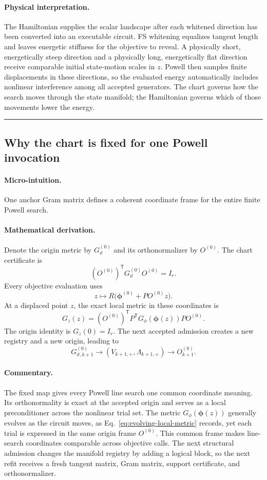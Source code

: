 \documentclass[10pt,twocolumn]{article}
\newcommand{\conceptbreak}{%
  \par\medskip\noindent
  {\color{black!30}\rule{\columnwidth}{0.35pt}}%
  \par\medskip}
\newcommand{\micro}{\paragraph{Micro-intuition.}}
\newcommand{\mathderiv}{\paragraph{Mathematical derivation.}}
\newcommand{\commentaryblock}{\paragraph{Commentary.}}
\newcommand{\physical}{\paragraph{Physical interpretation.}}
\begin{document}
\physical The Hamiltonian supplies the scalar landscape after each whitened
direction has been converted into an executable circuit. FS whitening
equalizes tangent length and leaves energetic stiffness for the objective to
reveal. A physically short, energetically steep direction and a physically
long, energetically flat direction receive comparable initial state-motion
scales in \(z\). Powell then samples finite displacements in these directions,
so the evaluated energy automatically includes nonlinear interference among
all accepted generators. The chart governs how the search moves through the
state manifold; the Hamiltonian governs which of those movements lower the
energy.

\conceptbreak

\subsection*{Why the chart is fixed for one Powell invocation}

\micro One anchor Gram matrix defines a coherent coordinate frame for the
entire finite Powell search.

\mathderiv Denote the origin metric by \(G_\vartheta^{(0)}\) and its
orthonormalizer by \(O^{(0)}\). The chart certificate is
\begin{equation}
(O^{(0)})^{\mathsf T}G_\vartheta^{(0)}O^{(0)}=I_r.
\label{eq:fixed-certificate}
\end{equation}
Every objective evaluation uses
\begin{equation}
z\longmapsto R\bigl(\bm\phi^{(0)}+PO^{(0)}z\bigr).
\label{eq:fixed-map}
\end{equation}
At a displaced point \(z\), the exact local metric in these coordinates is
\begin{equation}
G_z(z)=(O^{(0)})^{\mathsf T}P^{\mathsf T}
G_\phi(\bm\phi(z))P O^{(0)}.
\label{eq:evolving-local-metric}
\end{equation}
The origin identity is \(G_z(0)=I_r\). The next accepted admission creates a
new registry and a new origin, leading to
\begin{equation}
G_{\vartheta,k+1}^{(0)}
\longrightarrow (V_{k+1,+},\Lambda_{k+1,+})
\longrightarrow O_{k+1}^{(0)}.
\label{eq:next-chart}
\end{equation}

\commentaryblock The fixed map gives every Powell line search one common
coordinate meaning. Its orthonormality is exact at the accepted origin and
serves as a local preconditioner across the nonlinear trial set. The metric
\(G_\phi(\bm\phi(z))\) generally evolves as the circuit moves, as
Eq.~\eqref{eq:evolving-local-metric} records, yet each trial is expressed in
the same origin frame \(O^{(0)}\). This common frame makes line-search
coordinates comparable across objective calls. The next structural admission
changes the manifold registry by adding a logical block, so the next refit
receives a fresh tangent matrix, Gram matrix, support certificate, and
orthonormalizer.
\end{document}
